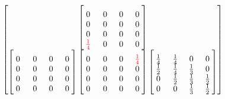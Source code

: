 {{$$\begin{bmatrix}
\begin{bmatrix}
\phantom{aa}&\phantom{dd} & \phantom{cc} & \phantom{dd} \\[-1.5ex]
0 & 0 & 0 & 0 \\
0 & 0 & 0 & 0 \\
0 & 0 & 0 & 0 \\
\textcolor{red}{\frac{1}{4}} & 0 & 0 & 0 \\
\end{bmatrix}
\\
\begin{bmatrix}
\phantom{aa}&\phantom{dd} & \phantom{cc} & \phantom{dd} \\[-1.5ex]
0 & 0 & 0 & 0 \\
0 & 0 & 0 & 0 \\
0 & 0 & 0 & 0 \\
0 & 0 & 0 & 0 \\
\end{bmatrix}
\begin{bmatrix}
\phantom{aa}&\phantom{dd} & \phantom{cc} & \phantom{dd} \\[-1.5ex]
0 & 0 & 0 & \textcolor{red}{\frac{1}{4}} \\
0 & 0 & 0 & 0 \\
0 & 0 & 0 & 0 \\
0 & 0 & 0 & 0 \\
\end{bmatrix}
\begin{bmatrix}
\phantom{aa}&\phantom{dd} & \phantom{cc} & \phantom{dd} \\[-1.5ex]
\frac{1}{4} & \frac{1}{4} & 0 & 0 \\
\frac{1}{2} & \frac{1}{4} & \frac{1}{3} & 0  \\
0 & \frac{1}{2} & \frac{1}{3} & \frac{1}{2} \\
0 & 0 & \frac{1}{3} & \frac{1}{2}  \\
\end{bmatrix}
\end{bmatrix}
$$

}

}

